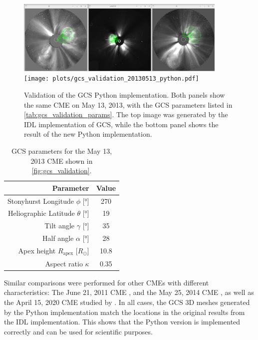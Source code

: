 \begin{figure}
	\centering
	\includegraphics[width=0.9\textwidth]{images/gcs_validation_20130513_idl.png}\\[5mm]
	\texttt{[image: plots/gcs\_validation\_20130513\_python.pdf]}
	\caption[Validation of the GCS Python implementation]{Validation of the GCS Python implementation. Both panels show the same CME on May 13, 2013, with the GCS parameters listed in \autoref{tab:gcs_validation_params}. The top image was generated by the IDL implementation of GCS, while the bottom panel shows the result of the new Python implementation.}
	\label{fig:gcs_validation}
\end{figure}

\begin{table}
	\centering
	\begin{tabular}{rS[table-format=3.2]}
		\toprule
		                                  {Parameter} & {Value} \\ \midrule
		   Stonyhurst Longitude $\phi$ [\si{\degree}] & 270     \\
		Heliographic Latitude $\theta$ [\si{\degree}] & 19      \\
		           Tilt angle $\gamma$ [\si{\degree}] & 35      \\
		           Half angle $\alpha$ [\si{\degree}] & 28      \\
		      Apex height $R_\text{apex}$ [$R_\odot$] & 10.8    \\
		                        Aspect ratio $\kappa$ & 0.35    \\ \bottomrule
	\end{tabular}
	\caption[GCS parameters for \autoref{fig:gcs_validation}]{GCS parameters for the May 13, 2013 CME shown in \autoref{fig:gcs_validation}.}
	\label{tab:gcs_validation_params}
\end{table}

Similar comparisons were performed for other CMEs with different characteristics: The June 21, 2011 CME \citep[originally reconstructed by][Table 1]{Heinemann-2019}, and the May 25, 2014 CME \citep[originally reconstructed by][Figure 5b]{Dumbovic2018-ForbMod}, as well as the April 15, 2020 CME studied by \citet{Forstner-2021-SolO}. In all cases, the GCS 3D meshes generated by the Python implementation match the locations in the original results from the IDL implementation. This shows that the Python version is implemented correctly and can be used for scientific purposes.
